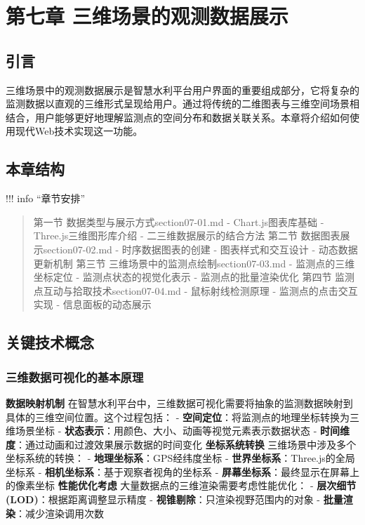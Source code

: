 \section{第七章 三维场景的观测数据展示}\label{ux7b2cux4e03ux7ae0-ux4e09ux7ef4ux573aux666fux7684ux89c2ux6d4bux6570ux636eux5c55ux793a}
\learningobjectives{ }\subsection{引言}\label{ux5f15ux8a00}
三维场景中的观测数据展示是智慧水利平台用户界面的重要组成部分，它将复杂的监测数据以直观的三维形式呈现给用户。通过将传统的二维图表与三维空间场景相结合，用户能够更好地理解监测点的空间分布和数据关联关系。本章将介绍如何使用现代Web技术实现这一功能。
\subsection{本章结构}\label{ux672cux7ae0ux7ed3ux6784} !!! info ``章节安排'' \begin{quote}
 第一节 数据类型与展示方式section07-01.md -
Chart.js图表库基础 - Three.js三维图形库介绍 - 二三维数据展示的结合方法 第二节 数据图表展示section07-02.md - 时序数据图表的创建 - 图表样式和交互设计 - 动态数据更新机制 第三节
三维场景中的监测点绘制section07-03.md - 监测点的三维坐标定位 - 监测点状态的视觉化表示 - 监测点的批量渲染优化 第四节 监测点互动与拾取技术section07-04.md - 鼠标射线检测原理 -
监测点的点击交互实现 - 信息面板的动态展示 
\end{quote} \subsection{关键技术概念}\label{ux5173ux952eux6280ux672fux6982ux5ff5}
\subsubsection{三维数据可视化的基本原理}\label{ux4e09ux7ef4ux6570ux636eux53efux89c6ux5316ux7684ux57faux672cux539fux7406}
\textbf{数据映射机制} 在智慧水利平台中，三维数据可视化需要将抽象的监测数据映射到具体的三维空间位置。这个过程包括： - \textbf{空间定位}：将监测点的地理坐标转换为三维场景坐标 -
\textbf{状态表示}：用颜色、大小、动画等视觉元素表示数据状态 - \textbf{时间维度}：通过动画和过渡效果展示数据的时间变化 \textbf{坐标系统转换} 三维场景中涉及多个坐标系统的转换： -
\textbf{地理坐标系}：GPS经纬度坐标 - \textbf{世界坐标系}：Three.js的全局坐标系 - \textbf{相机坐标系}：基于观察者视角的坐标系 - \textbf{屏幕坐标系}：最终显示在屏幕上的像素坐标
\textbf{性能优化考虑} 大量数据点的三维渲染需要考虑性能优化： - \textbf{层次细节(LOD)}：根据距离调整显示精度 - \textbf{视锥剔除}：只渲染视野范围内的对象 - \textbf{批量渲染}：减少渲染调用次数
